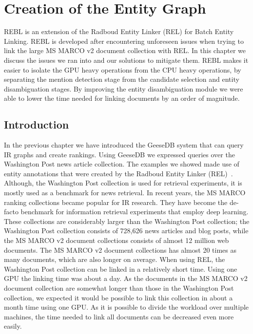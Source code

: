 \chapter{Creation of the Entity Graph}
\label{a-graph-of-entities}

\begin{Abstract}
	\begin{changemargin}{1cm}{1cm}
		REBL is an extension of the Radboud Entity Linker (REL) for Batch Entity Linking. 
		REBL is developed after encountering unforeseen issues when trying to link the large MS MARCO v2 document collection with REL. In this chapter we discuss the issues we ran into and our solutions to mitigate them. REBL makes it easier to isolate the GPU heavy operations from the CPU heavy operations, by separating the mention detection stage from the candidate selection and entity disambiguation stages. By improving the entity disambiguation module we were able to lower the time needed for linking documents by an order of magnitude.
	\end{changemargin}
\end{Abstract}

\section{Introduction}
In the previous chapter we have introduced the GeeseDB system that can query IR graphs and create rankings. Using GeeseDB we expressed queries over the Washington Post news article collection. The examples we showed made use of entity annotations that were created by the Radboud Entity Linker (REL)~\citep{rel}.
Although, the Washington Post collection is used for retrieval experiments, it is mostly used as a benchmark for news retrieval. 
In recent years, the MS MARCO ranking collections became popular for IR research. They have become the de-facto benchmark for information retrieval experiments that employ deep learning. These collections are considerably larger than the Washington Post collection; the Washington Post collection consists of 728,626 news articles and blog posts, while the MS MARCO v2 document collections consists of almost 12 million web documents. The MS MARCO v2 document collections has almost 20 times as many documents, which are also longer on average.
When using REL, the Washington Post collection can be linked in a relatively short time. Using one GPU the linking time was about a day. As the documents in the MS MARCO v2 document collection are somewhat longer than those in the Washington Post collection, we expected it would be possible to link this collection in about a month time using one GPU. As it is possible to divide the workload over multiple machines, the time needed to link all documents can be decreased even more easily. 

